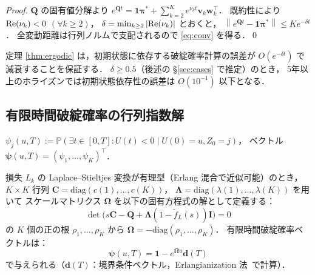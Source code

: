 \documentclass{ipsjlike}
\newcommand{\Prob}{\mathbb{P}}
\newcommand{\ruin}{\psi}
\newcommand{\norm}[1]{\left\lVert #1 \right\rVert}
\begin{document}
\begin{proof}
  $\bm{Q}$ の固有値分解より $e^{\bm{Q}t} = \bm{1}\bm{\pi}^* + \sum_{k=2}^{K} e^{\nu_k t}\bm{v}_k\bm{w}_k^\top$．
  既約性により ${\rm Re}(\nu_k) < 0$ $(\forall k \geq 2)$，
  $\delta = \min_{k \geq 2}|{\rm Re}(\nu_k)|$ とおくと，
  $\norm{e^{\bm{Q}t} - \bm{1}\bm{\pi}^*} \leq K e^{-\delta t}$．
  全変動距離は行列ノルムで支配されるので \eqref{eq:conv} を得る．\qed
\end{proof}

\begin{remark}[破綻確率計算への意義]
  定理 \ref{thm:ergodic} は，初期状態に依存する破綻確率計算の誤差が
  $O(e^{-\delta t})$ で減衰することを保証する．
  $\delta \geq 0.5$（後述の §\ref{sec:cases} で推定）のとき，
  5年以上のホライズンでは初期状態依存性の誤差は $O(10^{-1})$ 以下となる．
\end{remark}

\subsection{有限時間破綻確率の行列指数解}

\begin{definition}[有限時間破綻確率]\label{def:ruin}
  $\ruin_j(u,T) := \Prob(\exists t \in [0,T]: U(t) < 0 \mid U(0)=u, Z_0=j)$，
  ベクトル $\bm{\ruin}(u,T) = (\ruin_1,\ldots,\ruin_K)^\top$．
\end{definition}

\begin{theorem}[行列指数表現]\label{thm:matrix_exp}
  損失 $L_k$ の Laplace--Stieltjes 変換が有理型（Erlang 混合で近似可能）のとき，
  $K \times K$ 行列 $\bm{C} = \mathrm{diag}(c(1),\ldots,c(K))$，
  $\bm{\Lambda} = \mathrm{diag}(\lambda(1),\ldots,\lambda(K))$ を用いて
  スケールマトリクス $\bm{\Omega}$ を以下の固有方程式の解として定義する：
  \begin{equation}
    \det\!\bigl(s\bm{C} - \bm{Q} + \bm{\Lambda}(1 - \tilde{f}_L(s))\bm{I}\bigr) = 0
    \label{eq:char_eq}
  \end{equation}
  の $K$ 個の正の根 $\rho_1,\ldots,\rho_K$ から $\bm{\Omega} = -\mathrm{diag}(\rho_1,\ldots,\rho_K)$．
  有限時間破綻確率ベクトルは：
  \begin{equation}
    \bm{\ruin}(u,T) = \bm{1} - e^{\bm{\Omega} u}\bm{d}(T)
    \label{eq:ruin_sol}
  \end{equation}
  で与えられる（$\bm{d}(T)$：境界条件ベクトル，Erlangianization 法~\cite{ahn2005erlang}で計算）．
\end{theorem}
\end{document}
